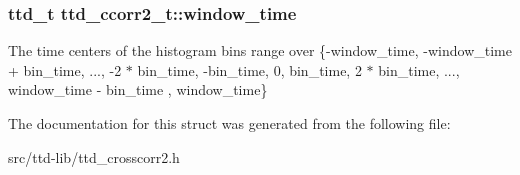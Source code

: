 \subsubsection[{window\+\_\+time}]{\setlength{\rightskip}{0pt plus 5cm}ttd\+\_\+t ttd\+\_\+ccorr2\+\_\+t\+::window\+\_\+time}\label{structttd__ccorr2__t_a2afa4d3a622ea10c731181ecaefc63c3}
The time centers of the histogram bins range over \{{\ttfamily -\/window\+\_\+time, -\/window\+\_\+time + bin\+\_\+time, ..., -\/2 $\ast$ bin\+\_\+time, -\/bin\+\_\+time, 0, bin\+\_\+time, 2 $\ast$ bin\+\_\+time, ..., window\+\_\+time -\/ bin\+\_\+time , window\+\_\+time}\} 

The documentation for this struct was generated from the following file\+:\begin{DoxyCompactItemize}
\item 
src/ttd-\/lib/ttd\+\_\+crosscorr2.\+h\end{DoxyCompactItemize}
